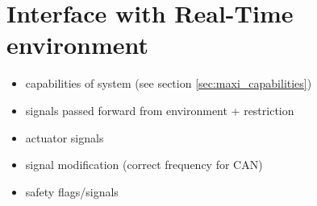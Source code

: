 \documentclass[ExampleMasters.tex]{subfiles}
\begin{document}
\section{Interface with Real-Time environment}
\label{sec:interface_with_real_time}

\begin{itemize}
	\item capabilities of system (see section \ref{sec:maxi_capabilities})
	\item signals passed forward from environment + restriction
	
	\item actuator signals
	\item signal modification (correct frequency for CAN)
	\item safety flags/signals
	
\end{itemize}
\end{document}
